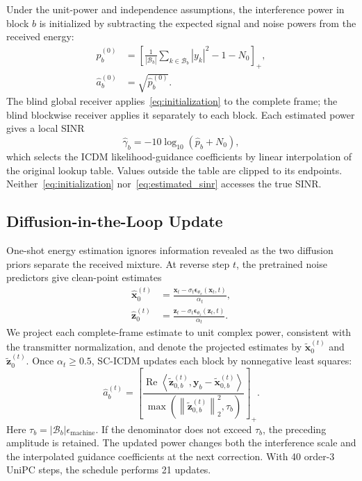 \documentclass[conference]{IEEEtran}
\newcommand{\method}{SC-ICDM}
\newcommand{\vect}[1]{\boldsymbol{#1}}
\newcommand{\norm}[1]{\left\lVert#1\right\rVert}
\newcommand{\pos}[1]{\left[#1\right]_{+}}
\begin{document}
Under the unit-power and independence assumptions, the interference power in
block $b$ is initialized by subtracting the expected signal and noise powers
from the received energy:
\begin{equation}
\begin{split}
    \widehat{p}_b^{(0)}
    &=
    \pos{
    \frac{1}{|\mathcal{B}_b|}
    \sum_{k\in\mathcal{B}_b}|y_k|^2-1-N_0},\\
    \widehat{a}_b^{(0)}
    &=\sqrt{\widehat{p}_b^{(0)}}.
\end{split}
\label{eq:initialization}
\end{equation}
The blind global receiver applies~\eqref{eq:initialization} to the complete
frame; the blind blockwise receiver applies it separately to each block.
Each estimated power gives a local SINR
\begin{equation}
    \widehat{\gamma}_b
    =-10\log_{10}\!\left(\widehat{p}_b+N_0\right),
    \label{eq:estimated_sinr}
\end{equation}
which selects the ICDM likelihood-guidance coefficients by linear
interpolation of the original lookup table. Values outside the table are
clipped to its endpoints. Neither~\eqref{eq:initialization}
nor~\eqref{eq:estimated_sinr} accesses the true SINR.

\subsection{Diffusion-in-the-Loop Update}

One-shot energy estimation ignores information revealed as the two diffusion
priors separate the received mixture. At reverse step $t$, the pretrained
noise predictors give clean-point estimates
\begin{equation}
\begin{split}
    \widehat{\vect{x}}_0^{(t)}
    &=
    \frac{\vect{x}_t-\sigma_t
    \vect{\epsilon}_{\theta_x}(\vect{x}_t,t)}{\alpha_t},\\
    \widehat{\vect{z}}_0^{(t)}
    &=
    \frac{\vect{z}_t-\sigma_t
    \vect{\epsilon}_{\theta_z}(\vect{z}_t,t)}{\alpha_t}.
\end{split}
\label{eq:denoised}
\end{equation}
We project each complete-frame estimate to unit complex power, consistent with
the transmitter normalization, and denote the projected estimates by
$\widetilde{\vect{x}}_0^{(t)}$ and $\widetilde{\vect{z}}_0^{(t)}$. Once
$\alpha_t\geq0.5$, \method{} updates each block by nonnegative least squares:
\begin{equation}
    \widehat{a}_b^{(t)}
    =
    \pos{
    \frac{
    \operatorname{Re}\!
    \left\langle
    \widetilde{\vect{z}}_{0,b}^{(t)},
    \vect{y}_b-\widetilde{\vect{x}}_{0,b}^{(t)}
    \right\rangle}
    {\max\!\left(
    \norm{\widetilde{\vect{z}}_{0,b}^{(t)}}_2^2,\tau_b
    \right)}}.
    \label{eq:update}
\end{equation}
Here $\tau_b=|\mathcal{B}_b|\epsilon_{\mathrm{machine}}$. If the
denominator does not exceed $\tau_b$, the preceding amplitude is retained.
The updated power changes both the interference scale and the interpolated
guidance coefficients at the next correction. With 40 order-3 UniPC steps,
the schedule performs 21 updates.
\end{document}
